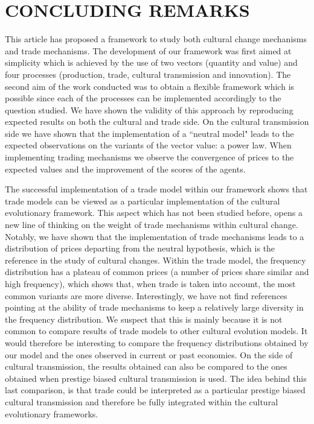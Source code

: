 \documentclass{wscpaperproc}
\begin{document}
\section{CONCLUDING REMARKS}

This article has proposed a framework to study both cultural change mechanisms and trade mechanisms. The development of our framework was first aimed at simplicity which is achieved by the use of two vectors (quantity and value) and four processes (production, trade, cultural transmission and innovation). The second aim of the work conducted was to obtain a flexible framework which is possible since each of the processes can be implemented accordingly to the question studied. We have shown the validity of this approach by reproducing expected results on both the cultural and trade side. On the cultural transmission side we have shown that the implementation of a ``neutral model" leads to the expected observations on the variants of the vector value: a power law. When implementing trading mechanisms we observe the convergence of prices to the expected values and the improvement of the scores of the agents.

The successful implementation of a trade model within our framework shows that trade models can be viewed as a particular implementation of the cultural evolutionary framework. This aspect which has not been studied before, opens a new line of thinking on the weight of trade mechanisms within cultural change. Notably, we have shown that the implementation of trade mechanisms leads to a distribution of prices departing from the neutral hypothesis, which is the reference in the study of cultural changes. Within the trade model, the frequency distribution has a plateau of common prices (a number of prices share similar and high frequency), which shows that, when trade is taken into account, the most common variants are more diverse. Interestingly, we have not find references pointing at the ability of trade mechanisms to keep a relatively large diversity in the frequency distribution. We suspect that this is mainly because it is not common to compare results of trade models to other cultural evolution models. It would therefore be interesting to compare the frequency distributions obtained by our model and the ones observed in current or past economies. On the side of cultural transmission, the results obtained can also be compared to the ones obtained when prestige biased cultural transmission is used. The idea behind this last comparison, is that trade could be interpreted as a particular prestige biased cultural transmission and therefore be fully integrated within the cultural evolutionary frameworks.
\end{document}
